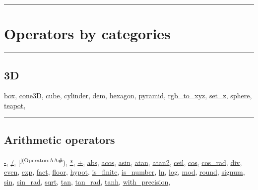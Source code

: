 \documentclass[]{book}
\theoremstyle{definition}
\theoremstyle{definition}
\theoremstyle{definition}
\theoremstyle{remark}
\begin{document}
\begin{center}\rule{0.5\linewidth}{\linethickness}\end{center}

\section{Operators by categories}\label{operators-by-categories-4}

\begin{center}\rule{0.5\linewidth}{\linethickness}\end{center}

\subsection{3D}\label{d-4}

\href{OperatorsBC\#box}{box}, \href{OperatorsBC\#cone3d}{cone3D},
\href{OperatorsBC\#cube}{cube}, \href{OperatorsBC\#cylinder}{cylinder},
\href{OperatorsDH\#dem}{dem}, \href{OperatorsDH\#hexagon}{hexagon},
\href{OperatorsNR\#pyramid}{pyramid},
\href{OperatorsNR\#rgb_to_xyz}{rgb\_to\_xyz},
\href{OperatorsSZ\#set_z}{set\_z}, \href{OperatorsSZ\#sphere}{sphere},
\href{OperatorsSZ\#teapot}{teapot},

\begin{center}\rule{0.5\linewidth}{\linethickness}\end{center}

\subsection{Arithmetic operators}\label{arithmetic-operators-4}

\href{OperatorsAA\#-}{-}, \href{OperatorsAA\#/}{/},
{[}\textsuperscript{{]}(OperatorsAA\#}), \href{OperatorsAA\#*}{*},
\href{OperatorsAA\#+}{+}, \href{OperatorsAA\#abs}{abs},
\href{OperatorsAA\#acos}{acos}, \href{OperatorsAA\#asin}{asin},
\href{OperatorsAA\#atan}{atan}, \href{OperatorsAA\#atan2}{atan2},
\href{OperatorsBC\#ceil}{ceil}, \href{OperatorsBC\#cos}{cos},
\href{OperatorsBC\#cos_rad}{cos\_rad}, \href{OperatorsDH\#div}{div},
\href{OperatorsDH\#even}{even}, \href{OperatorsDH\#exp}{exp},
\href{OperatorsDH\#fact}{fact}, \href{OperatorsDH\#floor}{floor},
\href{OperatorsDH\#hypot}{hypot},
\href{OperatorsIM\#is_finite}{is\_finite},
\href{OperatorsIM\#is_number}{is\_number}, \href{OperatorsIM\#ln}{ln},
\href{OperatorsIM\#log}{log}, \href{OperatorsIM\#mod}{mod},
\href{OperatorsNR\#round}{round}, \href{OperatorsSZ\#signum}{signum},
\href{OperatorsSZ\#sin}{sin}, \href{OperatorsSZ\#sin_rad}{sin\_rad},
\href{OperatorsSZ\#sqrt}{sqrt}, \href{OperatorsSZ\#tan}{tan},
\href{OperatorsSZ\#tan_rad}{tan\_rad}, \href{OperatorsSZ\#tanh}{tanh},
\href{OperatorsSZ\#with_precision}{with\_precision},
\end{document}
